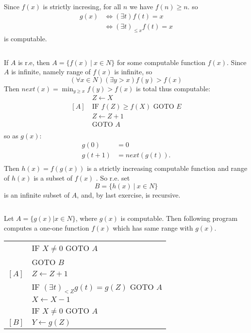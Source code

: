 \subsection{}
Since $ f(x) $ is strictly incresing, for all $n$ we have $ f(n) \ge n $.
so
\begin{align*}
  g(x) & \Leftrightarrow  (\exists t)f(t)=x \\
       & \Leftrightarrow  (\exists t)_{\le x}f(t)=x
\end{align*}
is computable.


\subsection{}
If $A$ is r.e, then $ A = \{ f(x)\ |\ x\in N \} $ for some computable function
$f(x)$. Since $A$ is infinite, namely range of $f(x)$ is infinite, so
\[ (\forall x\in N)(\exists y>x)f(y)>f(x) \]
Then $ next(x) = \min_{y\ge x} f(y)>f(x) $ is total thus computable:
\begin{align*}
       & Z \gets X \\
  [A]\ & \text{IF } f(Z)\ge f(X) \text{ GOTO } E \\
       & Z \gets Z + 1 \\
       & \text{GOTO } A \\
\end{align*}
so as $g(x)$:
\begin{align*}
  g(0)   & = 0 \\
  g(t+1) & = next(g(t)) .\\
\end{align*}
Then $ h(x) = f(g(x)) $ is a strictly increasing computable function and 
range of $h(x)$ is a subset of $f(x)$ . So r.e. set
\[ B = \{ h(x)\ |\ x\in N \} \]
is an infinite subset of $A$, and, by last exercise, is recursive.


\subsection{}
Let $ A = \{ g(x) | x \in N \} $, where $ g(x) $ is computable.
Then following program computes a one-one function $ f(x) $ which
has same range with $g(x)$.
\begin{center}
\begin{tabular}{ll}
        & IF $ X \neq 0 $ GOTO $A$ \\
        & GOTO $B$ \\
  $[A]$ & $ Z \gets Z + 1 $ \\
        & IF $ (\exists t)_{< Z}g(t)=g(Z) $ GOTO $A$ \\
        & $ X \gets X - 1 $ \\
        & IF $ X \neq 0 $ GOTO $A$ \\
  $[B]$ & $ Y \gets g(Z) $
\end{tabular}
\end{center}


